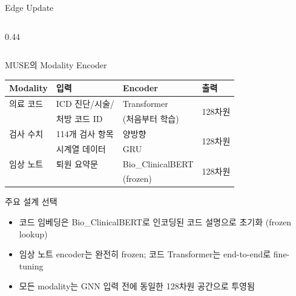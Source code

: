 \documentclass[
11pt,notheorems,hyperref={pdfauthor=whatever}
]{beamer}
\begin{document}
\begin{frame}{Edge Update}
\begin{columns}[c]
\begin{column}{0.44\textwidth}

\end{column}

\end{columns}
\end{frame}

\begin{frame}{MUSE의 Modality Encoder}

\begin{table}[]
\centering
\begin{tabular}{llll}
\toprule
\textbf{Modality} & \textbf{입력} & \textbf{Encoder} & \textbf{출력} \\
\midrule
의료 코드 & ICD 진단/시술/ & Transformer & \multirow{2}{*}{128차원} \\
          & 처방 코드 ID & (처음부터 학습) & \\
\midrule
검사 수치  & 114개 검사 항목 & 양방향 & \multirow{2}{*}{128차원} \\
          & 시계열 데이터  & GRU    & \\
\midrule
임상 노트 & 퇴원 요약문 & Bio\_ClinicalBERT & \multirow{2}{*}{128차원} \\
          &            & (frozen)         & \\
\bottomrule
\end{tabular}
\end{table}

\vspace{0.5em}

\begin{block}{주요 설계 선택}
\begin{itemize}
    \item 코드 임베딩은 Bio\_ClinicalBERT로 인코딩된 코드 설명으로 초기화 (frozen lookup)
    \item 임상 노트 encoder는 완전히 frozen; 코드 Transformer는 end-to-end로 fine-tuning
    \item 모든 modality는 GNN 입력 전에 동일한 128차원 공간으로 투영됨
\end{itemize}
\end{block}

\end{frame}
\end{document}
